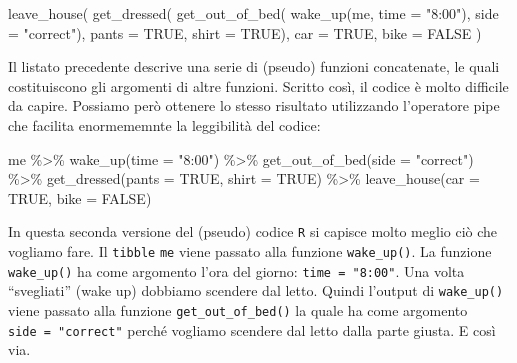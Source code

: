 \documentclass[
  11pt,
]{krantz}
\makeatletter
\newenvironment{Shaded}{\begin{snugshade}}{\end{snugshade}}
\newcommand{\AttributeTok}[1]{\textcolor[rgb]{0.61,0.61,0.61}{#1}}
\newcommand{\ConstantTok}[1]{\textcolor[rgb]{0,0,0}{#1}}
\newcommand{\FunctionTok}[1]{\textcolor[rgb]{0,0,0}{#1}}
\newcommand{\NormalTok}[1]{#1}
\newcommand{\SpecialCharTok}[1]{\textcolor[rgb]{0,0,0}{#1}}
\newcommand{\StringTok}[1]{\textcolor[rgb]{0.5,0.5,0.5}{#1}}
\newenvironment{kframe}{%
\medskip{}
\setlength{\fboxsep}{.8em}
 \def\at@end@of@kframe{}%
 \ifinner\ifhmode%
  \def\at@end@of@kframe{\end{minipage}}%
  \begin{minipage}{\columnwidth}%
 \fi\fi%
 \def\FrameCommand##1{\hskip\@totalleftmargin \hskip-\fboxsep
 \colorbox{shadecolor}{##1}\hskip-\fboxsep
     \hskip-\linewidth \hskip-\@totalleftmargin \hskip\columnwidth}%
 \MakeFramed {\advance\hsize-\width
   \@totalleftmargin\z@ \linewidth\hsize
   \@setminipage}}%
 {\par\unskip\endMakeFramed%
 \at@end@of@kframe}
\renewenvironment{Shaded}{\begin{kframe}}{\end{kframe}}
\theoremstyle{definition}
\theoremstyle{definition}
\theoremstyle{definition}
\theoremstyle{definition}
\theoremstyle{remark}
\makeatother
\begin{document}
\begin{Shaded}
\begin{Highlighting}[]
\FunctionTok{leave\_house}\NormalTok{(}
  \FunctionTok{get\_dressed}\NormalTok{(}
    \FunctionTok{get\_out\_of\_bed}\NormalTok{(}
      \FunctionTok{wake\_up}\NormalTok{(me, }\AttributeTok{time =} \StringTok{"8:00"}\NormalTok{), }
      \AttributeTok{side =} \StringTok{"correct"}\NormalTok{), }
    \AttributeTok{pants =} \ConstantTok{TRUE}\NormalTok{, }
    \AttributeTok{shirt =} \ConstantTok{TRUE}\NormalTok{), }
  \AttributeTok{car =} \ConstantTok{TRUE}\NormalTok{, }
  \AttributeTok{bike =} \ConstantTok{FALSE}
\NormalTok{)}
\end{Highlighting}
\end{Shaded}

Il listato precedente descrive una serie di (pseudo) funzioni concatenate, le quali costituiscono gli argomenti di altre funzioni. Scritto così, il codice è molto difficile da capire. Possiamo però ottenere lo stesso risultato utilizzando l'operatore pipe che facilita enormememnte la leggibilità del codice:

\begin{Shaded}
\begin{Highlighting}[]
\NormalTok{me }\SpecialCharTok{\%\textgreater{}\%} 
  \FunctionTok{wake\_up}\NormalTok{(}\AttributeTok{time =} \StringTok{"8:00"}\NormalTok{) }\SpecialCharTok{\%\textgreater{}\%} 
  \FunctionTok{get\_out\_of\_bed}\NormalTok{(}\AttributeTok{side =} \StringTok{"correct"}\NormalTok{) }\SpecialCharTok{\%\textgreater{}\%} 
  \FunctionTok{get\_dressed}\NormalTok{(}\AttributeTok{pants =} \ConstantTok{TRUE}\NormalTok{, }\AttributeTok{shirt =} \ConstantTok{TRUE}\NormalTok{) }\SpecialCharTok{\%\textgreater{}\%} 
  \FunctionTok{leave\_house}\NormalTok{(}\AttributeTok{car =} \ConstantTok{TRUE}\NormalTok{, }\AttributeTok{bike =} \ConstantTok{FALSE}\NormalTok{)}
\end{Highlighting}
\end{Shaded}

In questa seconda versione del (pseudo) codice \texttt{R} si capisce molto meglio ciò che vogliamo fare. Il \texttt{tibble} \texttt{me} viene passato alla funzione \texttt{wake\_up()}. La funzione \texttt{wake\_up()} ha come argomento l'ora del giorno: \texttt{time\ =\ "8:00"}. Una volta ``svegliati'' (wake up) dobbiamo scendere dal letto. Quindi l'output di \texttt{wake\_up()} viene passato alla funzione \texttt{get\_out\_of\_bed()} la quale ha come argomento \texttt{side\ =\ "correct"} perché vogliamo scendere dal letto dalla parte giusta. E così via.
\end{document}
